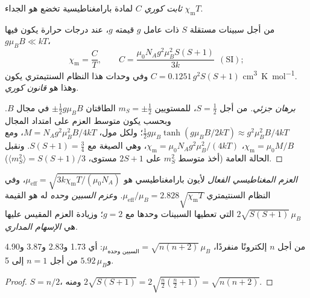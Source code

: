 \begin{definition}\label{def:b3:complex-spectra-magnetism:curie}
\emph{ثابت كوري} $C$ لمادة بارامغناطيسية تخضع
 هو الجداء $\chi_{\mathrm m}T$.
\end{definition}

\begin{theorem}\label{thm:b3:complex-spectra-magnetism:curie}
من أجل سبينات مستقلة $S$ ذات عامل $g$ قيمته $g$، عند درجات حرارة يكون فيها $g\mu_BB \ll kT$،
\[
  \chi_{\mathrm m} = \frac{C}{T}, \qquad C = \frac{\mu_0N_Ag^2\mu_B^2S(S+1)}{3k}\ \ (\text{SI});
\]
وفي وحدات هذا النظام السنتيمتري يكون $C = 0.1251\,g^2S(S+1)$ \unit{cm^3.K.mol^{-1}}. وهذا هو \emph{قانون كوري}.
\end{theorem}

\begin{proof}[برهان جزئي]
من أجل $S = \frac12$، للمستويين $m_S = \pm\frac12$ الطاقتان $\pm\frac12g\mu_BB$ في مجال $B$. وبحسب
 يكون متوسط العزم على امتداد المجال $\frac12g\mu_B\tanh(g\mu_BB/2kT) \approx
g^2\mu_B^2B/4kT$؛ ولكل مول، $M = N_Ag^2\mu_B^2B/4kT$، ومع $\chi_{\mathrm m} = \mu_0M/B$، $\chi_{\mathrm m} = \mu_0N_Ag^2\mu_B^2/(4kT)$،
وهي الصيغة مع $S(S+1) = \frac34$. ونقبل الحالة العامة (أخذ متوسط $m_S^2$ على $2S + 1$
مستوى، $\langle m_S^2\rangle = S(S+1)/3$).
\end{proof}

\begin{definition}\label{def:b3:complex-spectra-magnetism:moment}
\emph{العزم المغناطيسي الفعال} لأيون
بارامغناطيسي هو $\mu_{\mathrm{eff}} = \sqrt{3k\chi_{\mathrm m}T/(\mu_0N_A)}$، وفي النظام السنتيمتري $\mu_{\mathrm{eff}}/\mu_B = 2.828\sqrt{\chi_{\mathrm m}T}$. 
و\emph{عزم السبين وحده} له هو القيمة $2\sqrt{S(S+1)}\,\mu_B$ التي
تعطيها السبينات وحدها مع $g = 2$؛ وزيادة العزم المقيس عليها هي
\emph{الإسهام المداري}.
\end{definition}

\begin{proposition}\label{prop:b3:complex-spectra-magnetism:spin-only}
من أجل $n$ إلكترونًا منفردًا، $\mu_{\text{السبين وحده}} = \sqrt{n(n+2)}\,\mu_B$: أي 1.73 و2.83 و3.87 و4.90 و$5.92\,\mu_B$ من أجل
$n = 1$ إلى 5.
\end{proposition}

\begin{proof}
$S = n/2$، ومنه $2\sqrt{S(S+1)} = 2\sqrt{\frac n2(\frac n2 + 1)} = \sqrt{n(n+2)}$.
\end{proof}

